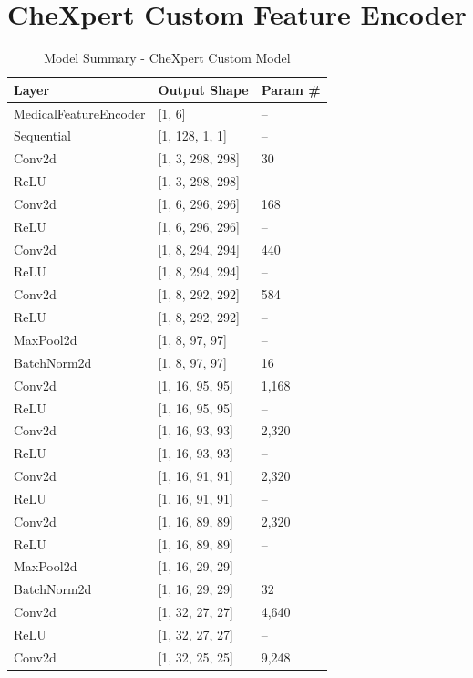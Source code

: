 \documentclass[12pt,DIV14,BCOR12mm,a4paper,footinclude=false,headinclude,parskip=half-,twoside,openright,cleardoublepage=empty,toc=index,bibliography=totoc,listof=totoc]{scrreprt}
\numberwithin{equation}{chapter}
\begin{document}
\section{CheXpert Custom Feature Encoder}
\vspace{-0.5cm}
\begin{table}[ht]
\caption{Model Summary - CheXpert Custom Model}
\centering
\begin{tabular}{|l|l|l|}
\hline
Layer & Output Shape & Param \# \\
\hline
MedicalFeatureEncoder & [1, 6] & -- \\
\hline
\quad Sequential & [1, 128, 1, 1] & -- \\
\quad\quad Conv2d & [1, 3, 298, 298] & 30 \\
\quad\quad ReLU & [1, 3, 298, 298] & -- \\
\quad\quad Conv2d & [1, 6, 296, 296] & 168 \\
\quad\quad ReLU & [1, 6, 296, 296] & -- \\
\quad\quad Conv2d & [1, 8, 294, 294] & 440 \\
\quad\quad ReLU & [1, 8, 294, 294] & -- \\
\quad\quad Conv2d & [1, 8, 292, 292] & 584 \\
\quad\quad ReLU & [1, 8, 292, 292] & -- \\
\quad\quad MaxPool2d & [1, 8, 97, 97] & -- \\
\quad\quad BatchNorm2d & [1, 8, 97, 97] & 16 \\
\quad\quad Conv2d & [1, 16, 95, 95] & 1,168 \\
\quad\quad ReLU & [1, 16, 95, 95] & -- \\
\quad\quad Conv2d & [1, 16, 93, 93] & 2,320 \\
\quad\quad ReLU & [1, 16, 93, 93] & -- \\
\quad\quad Conv2d & [1, 16, 91, 91] & 2,320 \\
\quad\quad ReLU & [1, 16, 91, 91] & -- \\
\quad\quad Conv2d & [1, 16, 89, 89] & 2,320 \\
\quad\quad ReLU & [1, 16, 89, 89] & -- \\
\quad\quad MaxPool2d & [1, 16, 29, 29] & -- \\
\quad\quad BatchNorm2d & [1, 16, 29, 29] & 32 \\
\quad\quad Conv2d & [1, 32, 27, 27] & 4,640 \\
\quad\quad ReLU & [1, 32, 27, 27] & -- \\
\quad\quad Conv2d & [1, 32, 25, 25] & 9,248 \\

\end{tabular}
\end{table}
\end{document}
